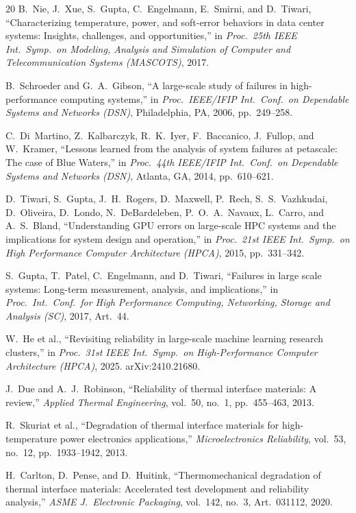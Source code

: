 \documentclass[conference]{IEEEtran}
\begin{document}
\begin{thebibliography}{20}
B.~Nie, J.~Xue, S.~Gupta, C.~Engelmann, E.~Smirni, and D.~Tiwari,
``Characterizing temperature, power, and soft-error behaviors in data
center systems: Insights, challenges, and opportunities,'' in
\emph{Proc.\ 25th IEEE Int.\ Symp.\ on Modeling, Analysis and Simulation
of Computer and Telecommunication Systems (MASCOTS)}, 2017.

B.~Schroeder and G.~A.~Gibson, ``A large-scale study of failures in
high-performance computing systems,'' in \emph{Proc.\ IEEE/IFIP Int.\
Conf.\ on Dependable Systems and Networks (DSN)}, Philadelphia, PA,
2006, pp.~249--258.

C.~Di~Martino, Z.~Kalbarczyk, R.~K.~Iyer, F.~Baccanico, J.~Fullop,
and W.~Kramer, ``Lessons learned from the analysis of system failures
at petascale: The case of Blue Waters,'' in \emph{Proc.\ 44th IEEE/IFIP
Int.\ Conf.\ on Dependable Systems and Networks (DSN)}, Atlanta, GA,
2014, pp.~610--621.

D.~Tiwari, S.~Gupta, J.~H.~Rogers, D.~Maxwell, P.~Rech, S.~S.~Vazhkudai,
D.~Oliveira, D.~Londo, N.~DeBardeleben, P.~O.~A.~Navaux, L.~Carro, and
A.~S.~Bland, ``Understanding GPU errors on large-scale HPC systems and
the implications for system design and operation,'' in \emph{Proc.\ 21st
IEEE Int.\ Symp.\ on High Performance Computer Architecture (HPCA)},
2015, pp.~331--342.

S.~Gupta, T.~Patel, C.~Engelmann, and D.~Tiwari, ``Failures in large
scale systems: Long-term measurement, analysis, and implications,'' in
\emph{Proc.\ Int.\ Conf.\ for High Performance Computing, Networking,
Storage and Analysis (SC)}, 2017, Art.~44.

W.~He et al., ``Revisiting reliability in large-scale machine learning
research clusters,'' in \emph{Proc.\ 31st IEEE Int.\ Symp.\ on
High-Performance Computer Architecture (HPCA)}, 2025.
arXiv:2410.21680.

J.~Due and A.~J.~Robinson, ``Reliability of thermal interface materials:
A review,'' \emph{Applied Thermal Engineering}, vol.~50, no.~1,
pp.~455--463, 2013.

R.~Skuriat et al., ``Degradation of thermal interface materials for
high-temperature power electronics applications,''
\emph{Microelectronics Reliability}, vol.~53, no.~12,
pp.~1933--1942, 2013.

H.~Carlton, D.~Pense, and D.~Huitink, ``Thermomechanical degradation
of thermal interface materials: Accelerated test development and
reliability analysis,'' \emph{ASME J.\ Electronic Packaging}, vol.~142,
no.~3, Art.~031112, 2020.


\end{thebibliography}
\end{document}
